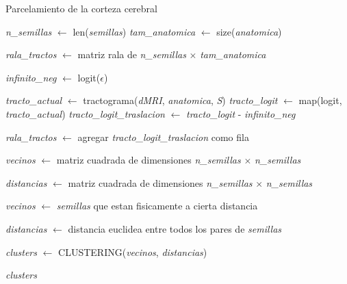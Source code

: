 \begin{algorithm}[h!]
\caption{Parcelamiento de la corteza cerebral}\label{alg:preclustering}
\begin{algorithmic}[1]


\State \emph{n\_semillas} $\gets$ len(\emph{semillas})
\State \emph{tam\_anatomica} $\gets$ size(\emph{anatomica})

\State \emph{rala\_tractos} $\gets$ matriz rala de \emph{n\_semillas} $\times$ \emph{tam\_anatomica}

\State \emph{infinito\_neg} $\gets$ logit($\epsilon$)

    \State \emph{tracto\_actual} $\gets$ tractograma(\emph{dMRI}, \emph{anatomica}, \emph{S})
    \State \emph{tracto\_logit} $\gets$ map(logit, \emph{tracto\_actual})
    \State \emph{tracto\_logit\_traslacion} $\gets$ \emph{tracto\_logit} - \emph{infinito\_neg}
    
    \State \emph{rala\_tractos} $\gets$ agregar \emph{tracto\_logit\_traslacion} como fila 
\EndFor

\State \emph{vecinos} $\gets$ matriz cuadrada de dimensiones \emph{n\_semillas} $\times$
                                                             \emph{n\_semillas}

\State \emph{distancias} $\gets$ matriz cuadrada de dimensiones \emph{n\_semillas} $\times$
                                                             \emph{n\_semillas}

\State \emph{vecinos} $\gets$ \emph{semillas} que estan fisicamente a cierta distancia 
                                                             
\State \emph{distancias} $\gets$ distancia euclidea entre todos los pares de \emph{semillas}

\State \emph{clusters} $\gets$ CLUSTERING(\emph{vecinos}, \emph{distancias})

\State \Return \emph{clusters} 
 
\EndProcedure 

\end{algorithmic}
\end{algorithm}

